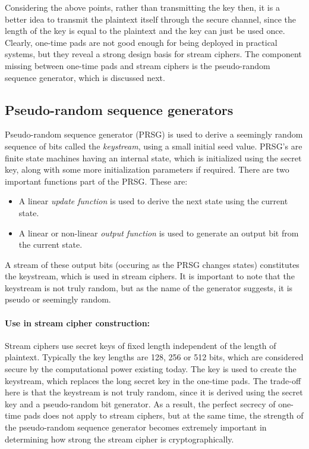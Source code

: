 Considering the above points, rather than transmitting the key then, it is a better idea to transmit the plaintext itself through the secure channel, since the length of the key is equal to the plaintext and the key can just be used once. Clearly, one-time pads are not good enough for being deployed in practical systems, but they reveal a strong design basis for stream ciphers. The component missing between one-time pads and stream ciphers is the pseudo-random sequence generator, which is discussed next. 


\subsection{Pseudo-random sequence generators}

Pseudo-random sequence generator (PRSG) is used to derive a seemingly random sequence of bits called the \emph{keystream}, using a small initial seed value. PRSG's are finite state machines having an internal state, which is initialized using the secret key, along with some more initialization parameters if required. There are two important functions part of the PRSG. These are:
\begin{itemize}
\item A linear \emph{update function} is used to derive the next state using the current state.
\item A linear or non-linear \emph{output function} is used to generate an output bit from the current state. 
\end{itemize}

A stream of these output bits (occuring as the PRSG changes states) constitutes the keystream, which is used in stream ciphers. It is important to note that the keystream is not truly random, but as the name of the generator suggests, it is pseudo or seemingly random. 


\paragraph{Use in stream cipher construction:}
\label{para:stream-construction} 
Stream ciphers use secret keys of fixed length independent of the length of plaintext. Typically the key lengths are 128, 256 or 512 bits, which are considered secure by the computational power existing today. %
The key is used to create the keystream, which replaces the long secret key in the one-time pads. The trade-off here is that the keystream is not truly random, since it is derived using the secret key and a pseudo-random bit generator. As a result, the perfect secrecy of one-time pads does not apply to stream ciphers, but at the same time, the strength of the pseudo-random sequence generator becomes extremely important in determining how strong the stream cipher is cryptographically.

